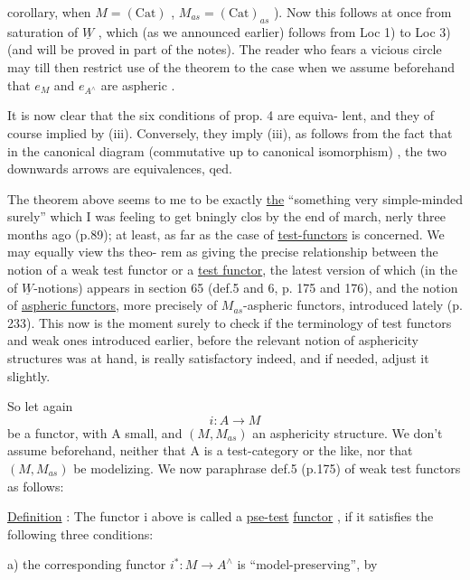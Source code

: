corollary,  when $M = (\mathrm{Cat})$ ,  $M_{as} = (\mathrm{Cat})_{as}$ ).  Now this follows at once
from  saturation of $\underline{W}$ ,  which (as we announced earlier) follows from
Loc 1)  to  Loc 3)  (and will be proved in  part  of the notes).
The reader who fears a vicious circle may till then restrict 
use of the theorem to the case when we assume beforehand that $e_M$ and
$e_{A^\wedge}$ are aspheric .

It is now clear that the six conditions of prop. 4  are equiva-%
lent,  and they   of course  implied by (iii).  Conversely,
they imply (iii),  as follows from the fact that in the canonical diagram
(commutative up to canonical isomorphism)
,
the two downwards arrows are equivalences,  qed.

The theorem above seems to me to be exactly \uline{the} ``something very
simple-minded surely'' which I was feeling to get bningly clos by
the end of march,  nerly three months ago (p.89);  at least,  as far as
the case of \uline{test-functors} is concerned.  We may equally view ths theo-%
rem as giving the precise relationship between the notion of a weak test
functor or a \uline{test functor}, \hand{(}the latest version of which (in the 
of $\underline{W}$-notions)  appears in section 65  (def.5 and 6,  p. 175 and 176)\hand{)},
and the notion of \uline{aspheric functors},  more precisely of $M_{as}$-aspheric
functors,  introduced lately (p. 233).  This now is the moment surely
to check if the terminology of test functors and weak ones  introduced
earlier,  before the relevant notion of asphericity structures was at
hand,  is really satisfactory indeed,  and if needed,  adjust it slightly.

So let again
\[ i\colon A \longrightarrow M \]
be a functor,  with A small,  and $(M,M_{as})$ an  asphericity structure.  We
don't  assume beforehand,  neither that A is a test-category or the like,
nor that $(M,M_{as})$ be modelizing.  We now paraphrase def.5  (p.175) of
weak test functors as follows:

\uline{Definition} :  The functor i above is called a \uline{pse-test} \uline{functor} ,
if it satisfies the following three conditions:

a)  the corresponding functor  $i^{*}\colon M \to A^\wedge$ is ``model-preserving'',  by

